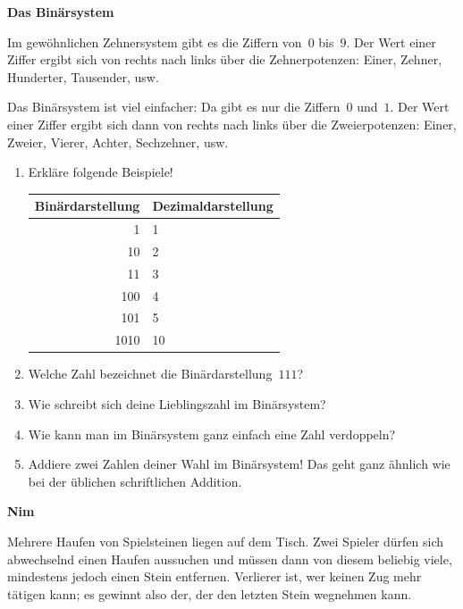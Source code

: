\documentclass[a4paper,ngerman,14pt]{scrartcl}
\newcommand{\header}[1]{\begin{center}
  \Huge\textbf{\textsf{#1}}
\end{center}}
\begin{document}
\header{Das Binärsystem}

Im gewöhnlichen Zehnersystem gibt es die Ziffern von~$0$ bis~$9$. Der Wert 
einer Ziffer ergibt sich von rechts nach links über die Zehnerpotenzen: Einer,
Zehner, Hunderter, Tausender, usw.

Das Binärsystem ist viel einfacher: Da gibt
es nur die Ziffern~$0$ und~$1$. Der Wert einer Ziffer ergibt sich dann von
rechts nach links über die Zweierpotenzen: Einer, Zweier, Vierer, Achter,
Sechzehner, usw.

\begin{enumerate}
\item Erkläre folgende Beispiele!

\begin{center}
\begin{tabular}{r|l}
  Binärdarstellung & Dezimaldarstellung \\\hline
  1 & 1 \\
  10 & 2 \\
  11 & 3 \\
  100 & 4 \\
  101 & 5 \\
  1010 & 10
\end{tabular}
\end{center}

\item Welche Zahl bezeichnet die Binärdarstellung~$111$?
\item Wie schreibt sich deine Lieblingszahl im Binärsystem?
\item Wie kann man im Binärsystem ganz einfach eine Zahl verdoppeln?
\item Addiere zwei Zahlen deiner Wahl im Binärsystem! Das geht ganz ähnlich wie
bei der üblichen schriftlichen Addition.
\end{enumerate}

\newpage

\header{Nim}

Mehrere Haufen von Spielsteinen liegen auf dem Tisch. Zwei Spieler dürfen
sich abwechselnd einen Haufen aussuchen und müssen dann von diesem beliebig viele,
mindestens jedoch einen Stein entfernen. Verlierer ist, wer keinen Zug mehr
tätigen kann; es gewinnt also der, der den letzten Stein wegnehmen kann.
\end{document}
